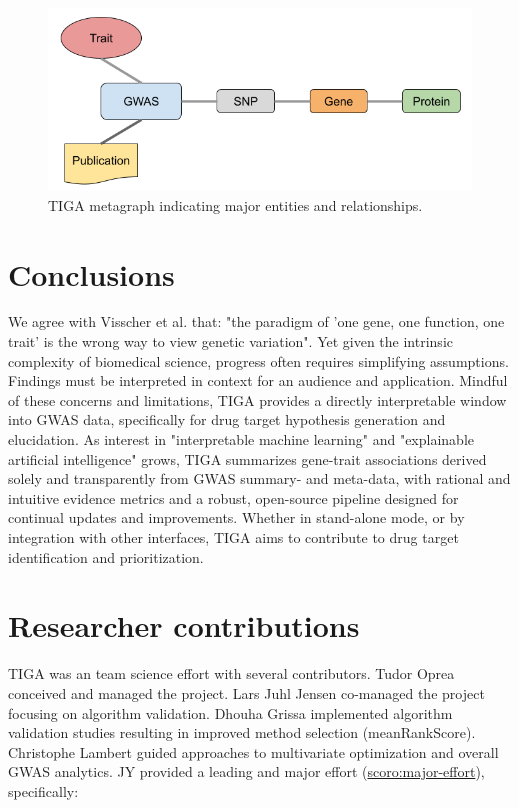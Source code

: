 \begin{figure}
	\includegraphics[width=\textwidth]{figures/tiga/TIGA_metagraph.png}
	\caption{TIGA metagraph indicating major entities and relationships.}
	\label{fig:TIGA_metagraph}
\end{figure}

\section{Conclusions}

We agree with Visscher et al. that: "the paradigm of 'one gene, one function, one trait' is the wrong way to view genetic variation"\cite{Visscher2017-jp}. Yet given the intrinsic complexity of biomedical science, progress often requires simplifying assumptions. Findings must be interpreted in context for an audience and application. Mindful of these concerns and limitations, TIGA provides a directly interpretable window into GWAS data, specifically for drug target hypothesis generation and elucidation. As interest in "interpretable machine learning" and "explainable artificial intelligence"\cite{Gilpin2018-da} grows, TIGA summarizes gene-trait associations derived solely and transparently from GWAS summary- and meta-data, with rational and intuitive evidence metrics and a robust, open-source pipeline designed for continual updates and improvements. Whether in stand-alone mode, or by integration with other interfaces, TIGA aims to contribute to drug target identification and prioritization. 


\section{Researcher contributions}

TIGA was an team science effort with several contributors. Tudor Oprea conceived and managed the project. Lars Juhl Jensen co-managed the project focusing on algorithm validation. Dhouha Grissa implemented algorithm validation studies resulting in improved method selection (meanRankScore). Christophe Lambert guided approaches to multivariate optimization and overall GWAS analytics. JY provided a leading and major effort (\href{http://purl.org/spar/scoro/major-effort}{scoro:major-effort}), specifically:

